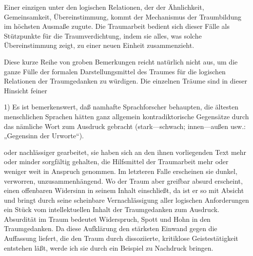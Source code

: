 \documentclass{article}
\begin{document}
            
        \pstart
        Einer einzigen unter den logischen Relationen, der der Ähnlichkeit, Gemeinsamkeit,
                  Übereinstimmung, kommt der Mechanismus der Traumbildung im höchsten
               Ausmaße zugute. Die Traumarbeit bedient sich dieser Fälle als Stützpunkte für
               die Traumverdichtung, indem sie alles, was solche Übereinstimmung zeigt, zu
               einer neuen Einheit zusammenzieht.
        \pend
    
            
        \pstart
        Diese kurze Reihe von groben Bemerkungen reicht natürlich nicht aus, um die
               ganze Fülle der formalen Darstellungsmittel des Traumes für die logischen
               Relationen der Traumgedanken zu würdigen. Die einzelnen Träume sind in dieser
               Hinsicht feiner
        \pend
    
            1) Es ist bemerkenswert, daß
               namhafte Sprachforscher behaupten, die ältesten menschlichen Sprachen hätten
               ganz allgemein kontradiktorische Gegensätze durch das nämliche Wort zum Ausdruck
               gebracht (stark—schwach; innen—außen usw.: „Gegensinn der Urworte“).
         
            
            
            
        \pstart
        oder nachlässiger gearbeitet, sie haben sich an den ihnen vorliegenden Text mehr oder minder sorgfältig gehalten, die Hilfsmittel der Traumarbeit mehr oder weniger weit in Anspruch
               genommen. Im letzteren Falle erscheinen sie dunkel, verworren,
               unzusammenhängend. Wo der Traum aber greifbar absurd erscheint, einen offenbaren
               Widersinn in seinem Inhalt einschließt, da ist er so mit Absicht und bringt
               durch seine scheinbare Vernachlässigung aller logischen Anforderungen
               ein Stück vom intellektuellen Inhalt der Traumgedanken zum Ausdruck.
               Absurdität im Traum bedeutet Widerspruch, Spott und Hohn in
               den Traumgedanken. Da diese Aufklärung den stärksten Einwand gegen die
               Auffassung liefert, die den Traum durch dissoziierte, kritiklose
               Geistestätigkeit entstehen läßt, werde ich sie durch ein Beispiel zu Nachdruck
               bringen.
        \pend
    
\end{document}
